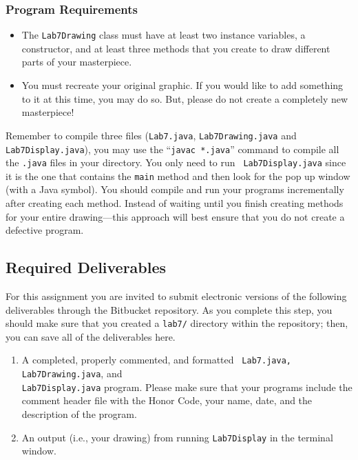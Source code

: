 \subsubsection*{Program Requirements}
\vspace{-0.05in}
\begin{itemize}
\item The {\tt Lab7Drawing}  class must have at least two instance variables, a constructor, and at least three methods
  that you create to draw different parts of your masterpiece. 
\item You must recreate your original graphic. If you would like to add something to it at this time, you may do so.
  But, please do not create a completely new masterpiece!
\end{itemize}
\vspace{-0.1in}

Remember to compile three files ({\tt Lab7.java}, {\tt Lab7Drawing.java} and {\tt Lab7Display.java}), you may use the
``{\tt javac *.java}'' command to compile all the {\tt .java} files in your directory. You only need to run {\tt
Lab7Display.java} since it is the one that contains the {\tt main} method and then look for the pop up window (with a
Java symbol). You should compile and run your programs incrementally after creating  each method. Instead of waiting
until you finish creating methods for your entire drawing---this approach will best ensure that you do not create a
defective program.

\vspace{-0.2in}
\subsection*{Required Deliverables}
\vspace{-0.05in}
For this assignment you are invited to submit electronic versions of the following deliverables through the Bitbucket repository. As you complete this step, you should make sure that you
created a {\tt lab7/} directory within the repository; then, you can save all of the deliverables here. 
\vspace{-0.05in}
\begin{enumerate}
	\item A completed, properly commented, and formatted {\tt
	  Lab7.java, Lab7Drawing.java}, and \\ {\tt Lab7Display.java}
	  program. Please make sure that your programs  include the
	  comment header file with the Honor Code, your name, date, and the description of the program.

        \item An output (i.e., your drawing) from running {\tt Lab7Display} in the terminal window.
\end{enumerate}
\vspace{-0.1in}

